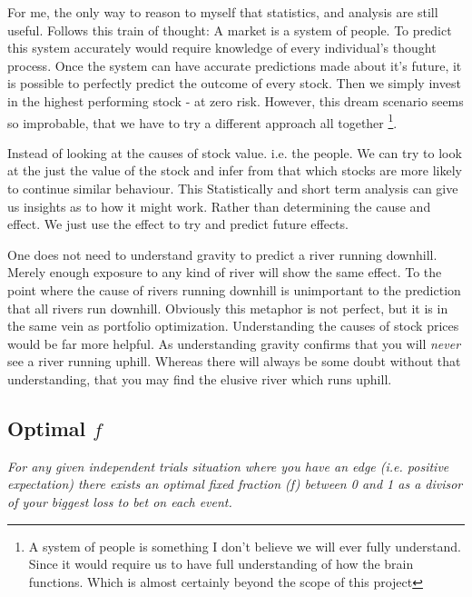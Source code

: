 \documentclass[11pt]{article}
\begin{document}
    For me, the only way to reason to myself that statistics, and analysis are still 
    useful. Follows this train of thought: A market is a system of people.
    To predict this system accurately would require knowledge of every individual's
    thought process. Once the system can have accurate predictions made about it's
    future, it is possible to perfectly predict the outcome of every stock. Then
    we simply invest in the highest performing stock - at zero risk. However, this
    dream scenario seems so improbable, that we have to try a different approach
    all together
    \footnote{A system of people is something I don't believe we will ever fully understand.
    Since it would require us to have full understanding of how the brain functions. Which
    is almost certainly beyond the scope of this project}.

    Instead of looking at the causes of stock value. i.e. the people. We can try to look
    at the just the value of the stock and infer from that which stocks are more
    likely to continue similar behaviour. This 
    Statistically and short term analysis can give us insights as to 
    how it might work. Rather than determining the cause and effect. We just use the effect
    to try and predict future effects.

    One does not need to understand gravity to predict a river running downhill. Merely
    enough exposure to any kind of river will show the same effect. To the point where
    the cause of rivers running downhill is unimportant to the prediction that all
    rivers run downhill. Obviously this metaphor is not perfect, but it is in the
    same vein as portfolio optimization. Understanding the causes of stock prices would
    be far more helpful. As understanding gravity confirms that you will \textit{never}
    see a river running uphill. Whereas there will always be some doubt without that
    understanding, that you may find the elusive river which runs uphill.

\subsection{Optimal \(f\)}

    \begin{displayquote} \textit {
        For any given independent trials situation where you have an edge (i.e. positive 
        expectation) there exists an optimal fixed
        fraction (f) between 0 and 1 as a divisor of your biggest loss to bet on each event.
    } \end{displayquote}
\end{document}
